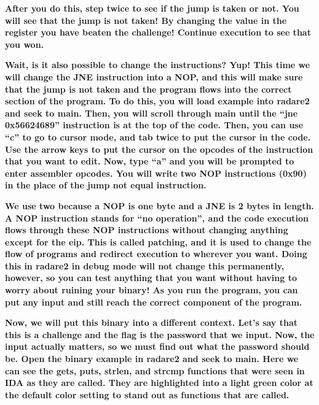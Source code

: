 \documentclass[letterpaper]{article}
\newcommand{\sitfig}[3]{
\begin{figure}[H]
\centering
\makebox[\textwidth][c]{
#2
}
\label{#1}
\end{figure}
}
\newcommand{\sitgfx}[4][scale=1.0]{
\sitfig{#3}{\texttt{[image: \#2]}}{#4}
}
\begin{document}
\textbf{After you do this, step twice to see if the jump is taken or not. You will see that the jump is not taken! By
changing the value in the register you have beaten the challenge! Continue execution to see that you won.}

\textbf{Wait, is it also possible to change the instructions? Yup! This time we will change the JNE instruction into a
NOP, and this will make sure that the jump is not taken and the program flows into the correct section of the program.
To do this, you will load example into radare2 and seek to main. Then, you will scroll through main until the ``jne
0x56624689'' instruction is at the top of the code. Then, you can use ``c'' to go to cursor mode, and tab twice to put
the cursor in the code. Use the arrow keys to put the cursor on the opcodes of the instruction that you want to edit.
Now, type ``a'' and you will be prompted to enter assembler opcodes.  You will write two NOP instructions (0x90) in the
place of the jump not equal instruction.}

  
\sitgfx[width=6.5in,height=4.0626in]{FINALWORKINGDOCFORMERLYPRECURSOR-img056.png}{fig:unk}{TODO CAPTION}
 

  
\sitgfx[width=6.5in,height=4.0626in]{FINALWORKINGDOCFORMERLYPRECURSOR-img057.png}{fig:unk}{TODO CAPTION}
 

\textbf{We use two because a NOP is one byte and a JNE is 2 bytes in length. A NOP instruction stands for ``no
operation'', and the code execution flows through these NOP instructions without changing anything except for the eip.
This is called patching, and it is used to change the flow of programs and redirect execution to wherever you want.
Doing this in radare2 in debug mode will not change this permanently, however, so you can test anything that you want
without having to worry about ruining your binary! As you run the program, you can put any input and still reach the
correct component of the program.}

\textbf{Now, we will put this binary into a different context. Let's say that this is a challenge and the flag is the
password that we input. Now, the input actually matters, so we must find out what the password should be. Open the
binary example in radare2 and seek to main. Here we can see the gets, puts, strlen, and strcmp functions that were seen
in IDA as they are called. They are highlighted into a light green color at the default color setting to stand out as
functions that are called.}

  
\sitgfx[width=6.5in,height=4.0626in]{FINALWORKINGDOCFORMERLYPRECURSOR-img053.png}{fig:unk}{TODO CAPTION}
 
\end{document}
